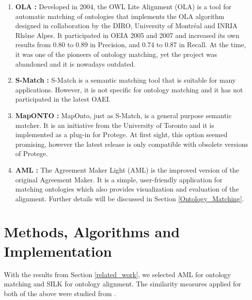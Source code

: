\documentclass[runningheads,a4paper]{../../StyleFiles/llncs}
\begin{document}
\begin{enumerate}
	\item \textbf{OLA \cite{euzenat2004ontology}:} Developed in 2004, the OWL Lite Alignment (OLA) is a tool for automatic matching of ontologies that implements the OLA algorithm designed in collaboration by the DIRO, University of Montréal and INRIA Rhône Alpes. It participated in OEIA 2005 \cite{euzenat2005ola} and 2007 \cite{djoufak2007ola} and increased its own results from 0.80 to 0.89 in Precision, and 0.74 to 0.87 in Recall. At the time, it was one of the pioneers of ontology matching, yet the project was abandoned and it is nowadays outdated.
	\item \textbf{S-Match \cite{giunchiglia2004s}:} S-Match is a semantic matching tool that is suitable for many applications. However, it is not specific for ontology matching and it has not participated in the latest OAEI.
	\item \textbf{MapONTO \cite{an2004refining}:} MapOnto, just as S-Match, is a general purpose semantic matcher. It is an initiative from the University of Toronto and it is implemented as a plug-in for Protege. At first sight, this option seemed promising, however the latest release is only compatible with obsolete versions of Protege. 
	\item \textbf{AML \cite{faria2013agreementmakerlight}:} The Agreement
	Maker Light (AML) is the improved version of the original Agreement Maker. It is a simple, user-friendly application for matching ontologies which also provides visualization and evaluation of the alignment. Further details will be discussed in Section \ref{Ontology_Matching}.
\end{enumerate}

\section{Methods, Algorithms and Implementation}
With the results from Section \ref{related_work}, we selected AML for ontology matching and SILK for ontology alignment. The similarity measures applied for both of the above were studied from \cite{sun2015comparative}.

\end{document}
